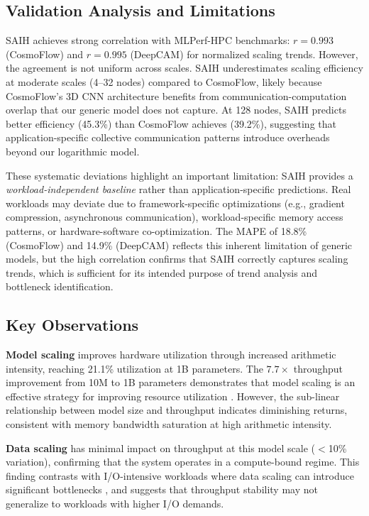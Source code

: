 \documentclass{llncs}
\begin{document}
\subsection{Validation Analysis and Limitations}

SAIH achieves strong correlation with MLPerf-HPC benchmarks: $r=0.993$ (CosmoFlow) and $r=0.995$ (DeepCAM) for normalized scaling trends. However, the agreement is not uniform across scales. SAIH underestimates scaling efficiency at moderate scales (4--32 nodes) compared to CosmoFlow, likely because CosmoFlow's 3D CNN architecture benefits from communication-computation overlap that our generic model does not capture. At 128 nodes, SAIH predicts better efficiency (45.3\%) than CosmoFlow achieves (39.2\%), suggesting that application-specific collective communication patterns introduce overheads beyond our logarithmic model.

These systematic deviations highlight an important limitation: SAIH provides a \textit{workload-independent baseline} rather than application-specific predictions. Real workloads may deviate due to framework-specific optimizations (e.g., gradient compression, asynchronous communication), workload-specific memory access patterns, or hardware-software co-optimization. The MAPE of 18.8\% (CosmoFlow) and 14.9\% (DeepCAM) reflects this inherent limitation of generic models, but the high correlation confirms that SAIH correctly captures scaling trends, which is sufficient for its intended purpose of trend analysis and bottleneck identification.

\subsection{Key Observations}

\textbf{Model scaling} improves hardware utilization through increased arithmetic intensity, reaching 21.1\% utilization at 1B parameters. The $7.7\times$ throughput improvement from 10M to 1B parameters demonstrates that model scaling is an effective strategy for improving resource utilization \cite{Jia2018}. However, the sub-linear relationship between model size and throughput indicates diminishing returns, consistent with memory bandwidth saturation at high arithmetic intensity.

\textbf{Data scaling} has minimal impact on throughput at this model scale ($<$10\% variation), confirming that the system operates in a compute-bound regime. This finding contrasts with I/O-intensive workloads where data scaling can introduce significant bottlenecks \cite{Byna2020}, and suggests that throughput stability may not generalize to workloads with higher I/O demands.
\end{document}
